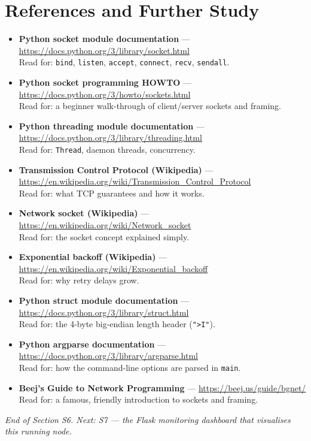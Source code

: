 \documentclass[11pt,a4paper]{article}
\begin{document}
\section{References and Further Study}
\begin{itemize}
  \item \textbf{Python socket module documentation} ---
        \url{https://docs.python.org/3/library/socket.html}\\
        Read for: \texttt{bind}, \texttt{listen}, \texttt{accept},
        \texttt{connect}, \texttt{recv}, \texttt{sendall}.
  \item \textbf{Python socket programming HOWTO} ---
        \url{https://docs.python.org/3/howto/sockets.html}\\
        Read for: a beginner walk-through of client/server sockets and framing.
  \item \textbf{Python threading module documentation} ---
        \url{https://docs.python.org/3/library/threading.html}\\
        Read for: \texttt{Thread}, daemon threads, concurrency.
  \item \textbf{Transmission Control Protocol (Wikipedia)} ---
        \url{https://en.wikipedia.org/wiki/Transmission_Control_Protocol}\\
        Read for: what TCP guarantees and how it works.
  \item \textbf{Network socket (Wikipedia)} ---
        \url{https://en.wikipedia.org/wiki/Network_socket}\\
        Read for: the socket concept explained simply.
  \item \textbf{Exponential backoff (Wikipedia)} ---
        \url{https://en.wikipedia.org/wiki/Exponential_backoff}\\
        Read for: why retry delays grow.
  \item \textbf{Python struct module documentation} ---
        \url{https://docs.python.org/3/library/struct.html}\\
        Read for: the 4-byte big-endian length header (\texttt{">I"}).
  \item \textbf{Python argparse documentation} ---
        \url{https://docs.python.org/3/library/argparse.html}\\
        Read for: how the command-line options are parsed in \texttt{main}.
  \item \textbf{Beej's Guide to Network Programming} ---
        \url{https://beej.us/guide/bgnet/}\\
        Read for: a famous, friendly introduction to sockets and framing.
\end{itemize}

\vfill
\begin{center}\footnotesize\itshape
End of Section S6. Next: S7 --- the Flask monitoring dashboard that visualises
this running node.
\end{center}
\end{document}
